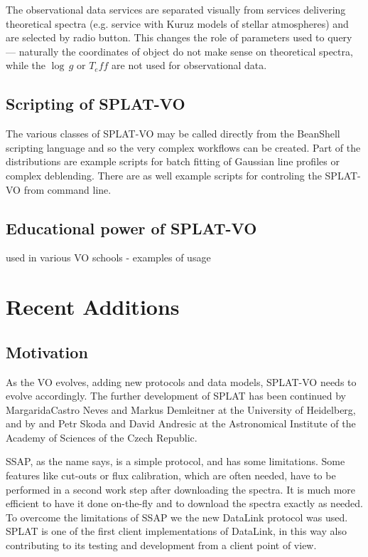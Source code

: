 \documentclass[final,authoryear,5p,times,twocolumn]{elsarticle}
\begin{document}
The observational data services are separated visually from services
delivering theoretical spectra (e.g. service with  Kuruz models of stellar
atmospheres) and are selected by radio button. This changes the role of
parameters used to query --- naturally the coordinates of object do not make
sense on theoretical spectra, while the $\log\,g$ or $T_eff$ are not used for
observational data.


\subsection{Scripting of SPLAT-VO}   

The various classes of SPLAT-VO may be called directly from the 
BeanShell scripting language \citep{niemeyer2013learning} and so the very complex workflows can be created.
Part of the distributions are example scripts for batch fitting of Gaussian line
profiles or complex deblending. There are as well example scripts for
controling the SPLAT-VO from command line.


\subsection{Educational power of SPLAT-VO}

used in various VO schools - examples of usage




\section{Recent Additions}


\subsection{Motivation}

As the VO evolves, adding new protocols and data models, SPLAT-VO
needs to evolve accordingly.  The further development of SPLAT has
been continued by MargaridaCastro Neves and Markus Demleitner at the
University of Heidelberg, and by and Petr Skoda and David Andresic at
the Astronomical Institute of the Academy of Sciences of the Czech
Republic.

SSAP, as the name says, is a simple protocol, and has some
limitations. Some features like cut-outs or flux calibration, which
are often needed, have to be performed in a second work step after
downloading the spectra. It is much more efficient to have it done
on-the-fly and  to download the spectra exactly as needed. To overcome
the limitations of SSAP we the new DataLink\cite{datalink} protocol
was used. SPLAT is one of the first client implementations of
DataLink, in this way also contributing to its testing and development
from a client point of view.
\end{document}
